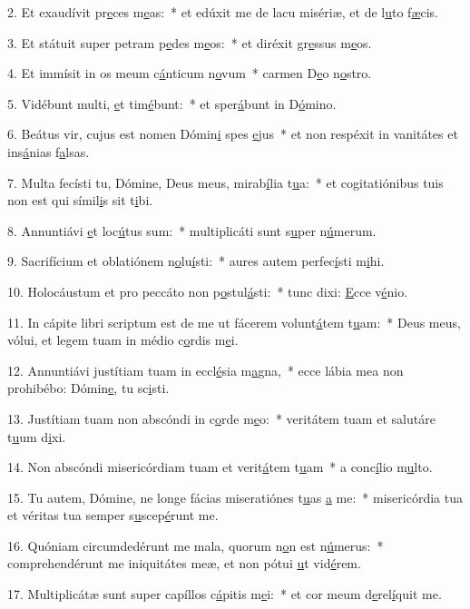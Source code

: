 2. Et exaudívit pr\uline{e}ces m\uline{e}as:~* et edúxit me de lacu misériæ, et de l\uline{u}to f\uline{æ}cis.\par 
3. Et státuit super petram p\uline{e}des m\uline{e}os:~* et diréxit gr\uline{e}ssus m\uline{e}os.\par 
4. Et immísit in os meum c\uline{á}nticum n\uline{o}vum~* carmen D\uline{e}o n\uline{o}stro.\par 
5. Vidébunt multi, \uline{e}t tim\uline{é}bunt:~* et sper\uline{á}bunt in D\uline{ó}mino.\par 
6. Beátus vir, cujus est nomen Dómin\uline{i} spes \uline{e}jus~* et non respéxit in vanitátes et ins\uline{á}nias f\uline{a}lsas.\par 
7. Multa fecísti tu, Dómine, Deus meus, mirab\uline{í}lia t\uline{u}a:~* et cogitatiónibus tuis non est qui símil\uline{i}s sit t\uline{i}bi.\par 
8. Annuntiávi \uline{e}t loc\uline{ú}tus sum:~* multiplicáti sunt s\uline{u}per n\uline{ú}merum.\par 
9. Sacrifícium et oblatiónem n\uline{o}lu\uline{í}sti:~* aures autem perfec\uline{í}sti m\uline{i}hi.\par 
10. Holocáustum et pro peccáto non p\uline{o}stul\uline{á}sti:~* tunc dixi: \uline{E}cce v\uline{é}nio.\par 
11. In cápite libri scriptum est de me ut fácerem volunt\uline{á}tem t\uline{u}am:~* Deus meus, vólui, et legem tuam in médio c\uline{o}rdis m\uline{e}i.\par 
12. Annuntiávi justítiam tuam in eccl\uline{é}sia m\uline{a}gna,~* ecce lábia mea non prohibébo: Dómin\uline{e}, tu sc\uline{i}sti.\par 
13. Justítiam tuam non abscóndi in c\uline{o}rde m\uline{e}o:~* veritátem tuam et salutáre t\uline{u}um d\uline{i}xi.\par 
14. Non abscóndi misericórdiam tuam et verit\uline{á}tem t\uline{u}am~* a conc\uline{í}lio m\uline{u}lto.\par 
15. Tu autem, Dómine, ne longe fácias miseratiónes t\uline{u}as \uline{a} me:~* misericórdia tua et véritas tua semper s\uline{u}scep\uline{é}runt me.\par 
16. Quóniam circumdedérunt me mala, quorum n\uline{o}n est n\uline{ú}merus:~* comprehendérunt me iniquitátes meæ, et non pótui \uline{u}t vid\uline{é}rem.\par 
17. Multiplicátæ sunt super capíllos c\uline{á}pitis m\uline{e}i:~* et cor meum d\uline{e}rel\uline{í}quit me.\par 
